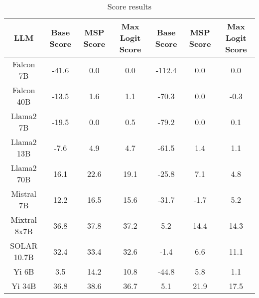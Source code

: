 \renewcommand\arraystretch{1.2}
\begin{table*}
\centering
\begin{tabular}{c|c|c|c|c|c|c}
LLM & Base Score & MSP Score & Max Logit Score & Base Score & MSP Score & Max Logit Score\\ \hline
Falcon 7B & -41.6 & 0.0 & 0.0 & -112.4 & 0.0 & 0.0\\
Falcon 40B & -13.5 & 1.6 & 1.1 & -70.3 & 0.0 & -0.3\\
Llama2 7B & -19.5 & 0.0 & 0.5 & -79.2 & 0.0 & 0.1\\
Llama2 13B & -7.6 & 4.9 & 4.7 & -61.5 & 1.4 & 1.1\\
Llama2 70B & 16.1 & 22.6 & 19.1 & -25.8 & 7.1 & 4.8\\
Mistral 7B & 12.2 & 16.5 & 15.6 & -31.7 & -1.7 & 5.2\\
Mixtral 8x7B & 36.8 & 37.8 & 37.2 & 5.2 & 14.4 & 14.3\\
SOLAR 10.7B & 32.4 & 33.4 & 32.6 & -1.4 & 6.6 & 11.1\\
Yi 6B & 3.5 & 14.2 & 10.8 & -44.8 & 5.8 & 1.1\\
Yi 34B & 36.8 & 38.6 & 36.7 & 5.1 & 21.9 & 17.5\\
\hline
\end{tabular}
\caption{Score results}
\end{table*}
\label{tab:score}
